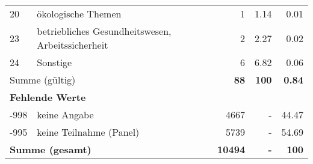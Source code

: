 \begin{longtable}{lXrrr}
        20 & \multicolumn{1}{X}{ökologische Themen} & %
          \num{1} &
          \num[round-mode=places,round-precision=2]{1,14} &
          \num[round-mode=places,round-precision=2]{0,01} \\

        23 & \multicolumn{1}{X}{betriebliches Gesundheitswesen, Arbeitssicherheit} & %
          \num{2} &
          \num[round-mode=places,round-precision=2]{2,27} &
          \num[round-mode=places,round-precision=2]{0,02} \\

        24 & \multicolumn{1}{X}{Sonstige} & %
          \num{6} &
          \num[round-mode=places,round-precision=2]{6,82} &
          \num[round-mode=places,round-precision=2]{0,06} \\

     \midrule
     \multicolumn{2}{l}{Summe (gültig)} &
       \textbf{\num{88}} &
     \textbf{100} &
       \textbf{\num[round-mode=places,round-precision=2]{0,84}} \\
     \multicolumn{5}{l}{\textbf{Fehlende Werte}}\\
       -998 &
       keine Angabe &
         \num{4667} &
        - &
         \num[round-mode=places,round-precision=2]{44,47} \\
       -995 &
       keine Teilnahme (Panel) &
         \num{5739} &
        - &
         \num[round-mode=places,round-precision=2]{54,69} \\
     \midrule
     \multicolumn{2}{l}{\textbf{Summe (gesamt)}} &
          \textbf{\num{10494}} &
        \textbf{-} &
        \textbf{100} \\
     \bottomrule
     \end{longtable}
     
